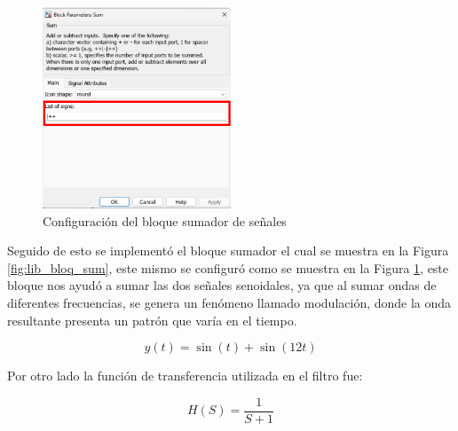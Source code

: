 \newpage

\begin{figure}[h!]
    \centering
    \includegraphics[width=0.5\textwidth]{fig/especifico_2/CASO_ESTUDIO_FILTRO/sum_1.pdf}
    \caption{Configuración del bloque sumador de señales}
    \label{fig:lib_bloq_sum_conf}
\end{figure}


Seguido de esto se implementó el bloque sumador el cual se muestra en la Figura \ref{fig:lib_bloq_sum}, este mismo se configuró como se muestra en la Figura \ref{fig:lib_bloq_sum_conf}, este bloque nos ayudó a sumar las dos señales senoidales, ya que al sumar ondas de diferentes frecuencias, se genera un fenómeno llamado modulación, donde la onda resultante presenta un patrón que varía en el tiempo.

\begin{equation}
    y(t) = \sin(t) + \sin(12t)
    \label{eq:funcion_de_suma_de_ondas}
\end{equation}

Por otro lado la función de transferencia utilizada en el filtro fue:

\begin{equation}
    H(S) = \frac{1}{S+1}
    \label{eq:funcion_de_transferencia_filtro}
\end{equation}

\newpage

